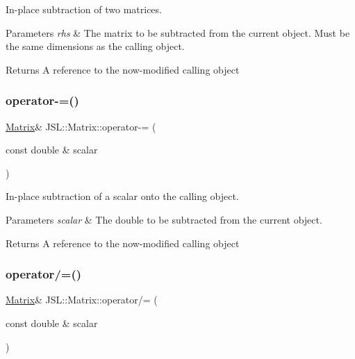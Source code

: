 In-\/place subtraction of two matrices. 


\begin{DoxyParams}{Parameters}
{\em rhs} & The matrix to be subtracted from the current object. Must be the same dimensions as the calling object. \\
\hline
\end{DoxyParams}
\begin{DoxyReturn}{Returns}
A reference to the now-\/modified calling object 
\end{DoxyReturn}
\mbox{\label{classJSL_1_1Matrix_a894ff64b1350616ddf2a48ec0f58e2c5}} 
\subsubsection{\texorpdfstring{operator-\/=()}{operator-=()}\hspace{0.1cm}{\footnotesize\ttfamily [2/2]}}
{\footnotesize\ttfamily \hyperlink{classJSL_1_1Matrix}{Matrix}\& J\+S\+L\+::\+Matrix\+::operator-\/= (\begin{DoxyParamCaption}\item[{const double \&}]{scalar }\end{DoxyParamCaption})\hspace{0.3cm}{\ttfamily [inline]}}



In-\/place subtraction of a scalar onto the calling object. 


\begin{DoxyParams}{Parameters}
{\em scalar} & The double to be subtracted from the current object. \\
\hline
\end{DoxyParams}
\begin{DoxyReturn}{Returns}
A reference to the now-\/modified calling object 
\end{DoxyReturn}
\mbox{\label{classJSL_1_1Matrix_a6caa5725c4dacc9a841147e80e9c43a4}} 
\subsubsection{\texorpdfstring{operator/=()}{operator/=()}}
{\footnotesize\ttfamily \hyperlink{classJSL_1_1Matrix}{Matrix}\& J\+S\+L\+::\+Matrix\+::operator/= (\begin{DoxyParamCaption}\item[{const double \&}]{scalar }\end{DoxyParamCaption})\hspace{0.3cm}{\ttfamily [inline]}}



